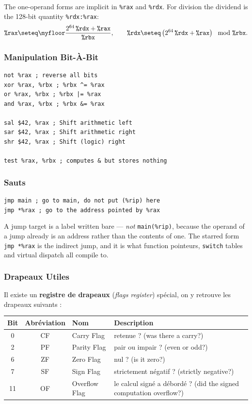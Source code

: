 The one-operand forms are implicit in \verb|%rax| and \verb|%rdx|. For division
the dividend is the 128-bit quantity \verb|%rdx:%rax|:
\[
  \texttt{\%rax} \seteq
    \myfloor{\frac{2^{64}\,\texttt{\%rdx} + \texttt{\%rax}}{\texttt{\%rbx}}},
  \qquad
  \texttt{\%rdx} \seteq
    \left(2^{64}\,\texttt{\%rdx} + \texttt{\%rax}\right) \mod \texttt{\%rbx}.
\]

\subsubsection{Manipulation Bit-À-Bit}
\begin{lstlisting}[language=gas]
not %rax ; reverse all bits
xor %rax, %rbx ; %rbx ^= %rax
or %rax, %rbx ; %rbx |= %rax
and %rax, %rbx ; %rbx &= %rax

sal $42, %rax ; Shift arithmetic left
sar $42, %rax ; Shift arithmetic right
shr $42, %rax ; Shift (logic) right

test %rax, %rbx ; computes & but stores nothing
\end{lstlisting}

\subsubsection{Sauts}
\begin{lstlisting}[language=gas]
jmp main ; go to main, do not put (%rip) here
jmp *%rax ; go to the address pointed by %rax
\end{lstlisting}

A jump target is a label written bare --- \emph{not} \verb|main(%rip)|, because
the operand of a jump already is an address rather than the contents of one.
The starred form \verb|jmp *%rax| is the indirect jump, and it is what function
pointeurs, \verb|switch| tables and virtual dispatch all compile to.

\subsubsection{Drapeaux Utiles}
Il existe un \textbf{registre de drapeaux} (\textit{flags register}) spécial, on
y retrouve les drapeaux suivants :
\begin{center}
  \begin{tabular}{c c l l}
    \toprule
    Bit & Abréviation & Nom & Description \\
    \midrule
    0  & CF & Carry Flag    & retenue ? (was there a carry?) \\
    2  & PF & Parity Flag   & pair ou impair ? (even or odd?) \\
    6  & ZF & Zero Flag     & nul ? (is it zero?) \\
    7  & SF & Sign Flag     & strictement négatif ? (strictly negative?) \\
    11 & OF & Overflow Flag & le calcul signé a débordé ? (did the signed computation overflow?) \\
    \bottomrule
  \end{tabular}
\end{center}

